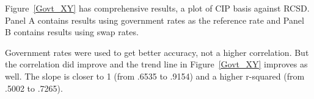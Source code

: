 

 





 


 

Figure~\ref{Govt_XY} has comprehensive results, a plot of CIP basis against RCSD.  Panel A contains results using government rates as the reference rate and Panel B contains results using swap rates.

Government rates were used to get better accuracy, not a higher correlation.  But the correlation did improve and the trend line in Figure~\ref{Govt_XY} improves as well.  The slope is closer to 1 (from .6535 to .9154) and a higher r-squared (from .5002 to .7265).



